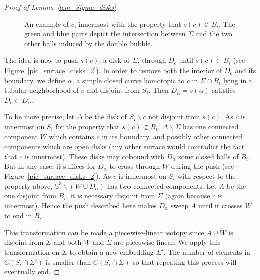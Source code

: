 \documentclass[11pt,a4paper]{article}
\newcommand{\Sp}{\mathbb S}
\begin{document}
\begin{proof}[Proof of Lemma~\ref{lem_Sigma_disks}]
\begin{figure}[H]
\begin{center}
\caption{An example of $c$, innermost with the property that $s(c) \not \subset B_i$. The green and blue parts depict the intersection between $\Sigma$ and the two other balls induced by the double bubble.} 
\label{pic_surface_disks}
\end{center}
\end{figure}

The idea is now to push $s(c)$, a disk of $\Sigma$, through $D_c$ until ${s(c)} \subset B_i$ (see Figure~\ref{pic_surface_disks_2}). In order to remove both the interior of $D_c$ and its boundary, we define $\alpha$, a simple closed curve homotopic to $c$ in $\Sigma \cap B_i$ lying in a tubular neighborhood of $c$ and disjoint from $S_i$. Then $D_\alpha = s(\alpha)$ satisfies $D_c \subset D_\alpha$. 

To be more precise, let $\Delta$ be the disk of $S_i \smallsetminus c$ not disjoint from $s(c)$. As $c$ is innermost on $S_i$ for the property that $s(c) \not \subset B_i$, $\Delta \smallsetminus \Sigma$ has one connected component $W$ which contains $c$ in its boundary, and possibly other connected components which are open disks (any other surface would contradict the fact that $c$ is innermost). These disks may cobound with $D_\alpha$ some closed balls of $B_i$. But in any case, it suffices for $D_\alpha$ to cross through $W$ during the push (see Figure~\ref{pic_surface_disks_2}). As $c$ is innermost on $S_i$ with respect to the property above, $\Sp^3 \smallsetminus (W \cup D_\alpha)$ has two connected components. Let $A$ be the one disjoint from $B_i$, it is necessary disjoint from $\Sigma$ (again because $c$ is innermost). Hence the push described here makes $D_\alpha$ sweep $A$ until it crosses $W$ to end in $B_i$.


This transformation can be made a piecewise-linear isotopy since $A \cup \mathring W$ is disjoint from $\Sigma$ and both $W$ and $\Sigma$ are piecewise-linear. We apply this transformation on $\Sigma$ to obtain a new embedding $\Sigma'$. The number of elements in $C(S_i \cap \Sigma')$ is smaller than $C(S_i \cap \Sigma)$ so that repeating this process will eventually end. 



\end{proof}
\end{document}
